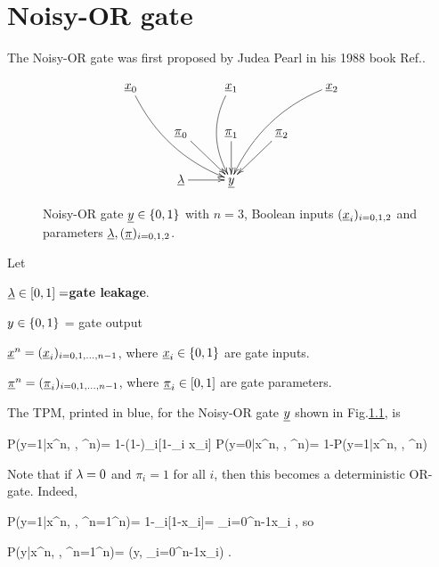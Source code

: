 \chapter{Noisy-OR gate}\label{ch-noisy-or}
The Noisy-OR gate was first
proposed by Judea Pearl in his 1988 book
 Ref.\cite{pearl-1988book}.
\begin{figure}[h!]
$$\xymatrix{
\rvx_0\ar@/_1pc/[ddrr]
&&\rvx_1\ar@/_1pc/[dd]
&&\rvx_2\ar@/_1pc/[ddll]
\\
&\ul{\pi}_0\ar[dr]
&\ul{\pi}_1\ar[d]
&\ul{\pi}_2\ar[dl]
\\
&\ul{\lam}\ar[r]
&\rvy
}$$
\caption{Noisy-OR gate ${\underline{y}}\in\{0,1\}$
with $n=3$, Boolean inputs $({\underline{x}}_i)_{i=0,1,2}$
and parameters 
$\underline{\lambda}, (\underline{\pi})_{i=0,1,2}$.
}
\label{fig-noisy-or-simple}
\end{figure}

Let

$\underline{\lambda}\in [0, 1]=${\bf gate leakage}.

$y\in \{0,1\}$ = gate  output

${\underline{x}}^n=({\underline{x}}_i)_{i=0,1, \ldots, n-1}$, where
${\underline{x}}_i\in\{0,1\}$ are
 gate inputs.

$\underline{\pi}^n=(\underline{\pi}_i)_{i=0,1, \ldots, n-1}$, where
$\underline{\pi}_i\in[0,1]$ are
 gate parameters.


The TPM, printed in blue,
 for the Noisy-OR gate ${\underline{y}}$ 
shown in Fig.\ref{fig-noisy-or-simple},
 is

\beq\color{blue}
P(y=1|x^n, \lam, \pi^n)=
1-(1-\lam)\prod_i[1-\pi_i x_i]
\label{eq-noisy-or-tmp-1}
\eeq
\beq\color{blue}
P(y=0|x^n, \lam, \pi^n)=
1-P(y=1|x^n, \lam, \pi^n)
\eeq

Note
that if $\lambda=0$ and $\pi_i=1$ for all $i$,
then this becomes 
a deterministic OR-gate. Indeed,

\beq
P(y=1|x^n, , \pi^n=1^n)= 1-\prod_i[1-x_i]=
\V_{i=0}^{n-1}x_i
\;,
\eeq
so 

\beq
P(y|x^n, , \pi^n=1^n)=
\delta(y, \V_{i=0}^{n-1}x_i)
\;.
\eeq

